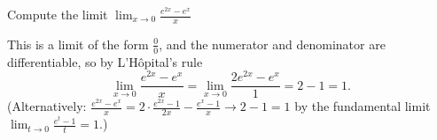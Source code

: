 
\begin{question}
Compute the limit $\displaystyle\lim_{x\to0}\frac{e^{2x}-e^x}{x}$
\end{question}

\begin{solution}
This is a limit of the form $\frac00$, and the numerator and denominator are differentiable, so by L'Hôpital's rule
\[ \lim_{x\to0}\frac{e^{2x}-e^x}{x}=\lim_{x\to0}\frac{2e^{2x}-e^x}{1}=2-1=\boxed{1}. \]
(Alternatively: $\frac{e^{2x}-e^x}{x}=2\cdot\frac{e^{2x}-1}{2x}-\frac{e^x-1}{x}\to 2-1=1$ by the fundamental limit $\lim_{t\to0}\frac{e^t-1}{t}=1$.)
\end{solution}
